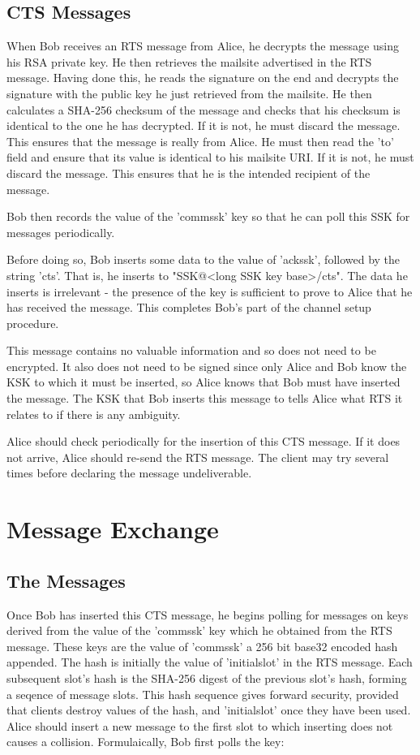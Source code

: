 \documentclass[12pt,a4paper]{article}
\begin{document}
\subsection{CTS Messages}
When Bob receives an RTS message from Alice, he decrypts the message using his RSA private key. He then retrieves the mailsite advertised in the RTS message. Having done this, he reads the signature on the end and decrypts the signature with the public key he just retrieved from the mailsite. He then calculates a SHA-256 checksum of the message and checks that his checksum is identical to the one he has decrypted. If it is not, he must discard the message. This ensures that the message is really from Alice. He must then read the 'to' field and ensure that its value is identical to his mailsite URI. If it is not, he must discard the message. This ensures that he is the intended recipient of the message.

Bob then records the value of the 'commssk' key so that he can poll this SSK for messages periodically.

Before doing so, Bob inserts some data to the value of 'ackssk', followed by the string 'cts'. That is, he inserts to "SSK@<long SSK key base>/cts". The data he inserts is irrelevant - the presence of the key is sufficient to prove to Alice that he has received the message. This completes Bob's part of the channel setup procedure.

This message contains no valuable information and so does not need to be encrypted. It also does not need to be signed since only Alice and Bob know the KSK to which it must be inserted, so Alice knows that Bob must have inserted the message. The KSK that Bob inserts this message to tells Alice what RTS it relates to if there is any ambiguity.

Alice should check periodically for the insertion of this CTS message. If it does not arrive, Alice should re-send the RTS message. The client may try several times before declaring the message undeliverable.

\section{Message Exchange}
\subsection{The Messages}
Once Bob has inserted this CTS message, he begins polling for messages on keys derived from the value of the 'commssk' key which he obtained from the RTS message. These keys are the value of 'commssk' a 256 bit base32 encoded hash appended. The hash is initially the value of 'initialslot' in the RTS message. Each subsequent slot's hash is the SHA-256 digest of the previous slot's hash, forming a seqence of message slots. This hash sequence gives forward security, provided that clients destroy values of the hash, and 'initialslot' once they have been used. Alice should insert a new message to the first slot to which inserting does not causes a collision. Formulaically, Bob first polls the key:
\end{document}
